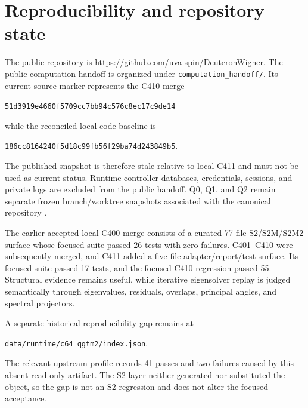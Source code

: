 \documentclass[11pt,oneside]{book}
\newcommand{\codepath}[1]{\nolinkurl{#1}}
\begin{document}
\chapter{Reproducibility and repository state}
\label{app:reproducibility}

The public repository is \url{https://github.com/uva-spin/DeuteronWigner}.  The public computation handoff is organized under \codepath{computation_handoff/}.  Its current source marker represents the C410 merge
\begin{center}
\texttt{51d3919e4660f5709cc7bb94c576c8ec17c9de14}
\end{center}
while the reconciled local code baseline is
\begin{center}
\texttt{186cc8164240f5d18c99fb56f29ba74d243849b5}.
\end{center}
The published snapshot is therefore stale relative to local C411 and must not be used as current status.  Runtime controller databases, credentials, sessions, and private logs are excluded from the public handoff.  Q0, Q1, and Q2 remain separate frozen branch/worktree snapshots associated with the canonical repository \cite{DeuteronWignerRepo2026,DWC400S2Record2026,DWC401C410Record2026,DWC411Record2026}.

The earlier accepted local C400 merge consists of a curated 77-file S2/S2M/S2M2 surface whose focused suite passed 26 tests with zero failures.  C401--C410 were subsequently merged, and C411 added a five-file adapter/report/test surface.  Its focused suite passed 17 tests, and the focused C410 regression passed 55.  Structural evidence remains useful, while iterative eigensolver replay is judged semantically through eigenvalues, residuals, overlaps, principal angles, and spectral projectors.

A separate historical reproducibility gap remains at
\begin{center}
\codepath{data/runtime/c64_qgtm2/index.json}.
\end{center}
The relevant upstream profile records 41 passes and two failures caused by this absent read-only artifact.  The S2 layer neither generated nor substituted the object, so the gap is not an S2 regression and does not alter the focused acceptance.
\end{document}
